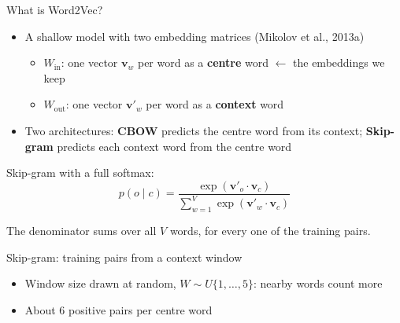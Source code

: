 \documentclass[aspectratio=169,11pt]{beamer}
\newcommand{\muted}[1]{\textcolor{muted}{#1}}
\newcommand{\hl}[1]{\textcolor{accent}{\textbf{#1}}}
\begin{document}
\begin{frame}{What is Word2Vec?}
    \begin{itemize}
        \item A shallow model with two embedding matrices \muted{(Mikolov et al., 2013a)}
        \begin{itemize}
            \item $W_{\text{in}}$: one vector $\mathbf{v}_w$ per word as a \hl{centre} word \quad $\leftarrow$ the embeddings we keep
            \item $W_{\text{out}}$: one vector $\mathbf{v}'_w$ per word as a \hl{context} word
        \end{itemize}
        \item Two architectures: \textbf{CBOW} predicts the centre word from its context;
              \textbf{Skip-gram} predicts each context word from the centre word
    \end{itemize}
    \vspace{3mm}
    Skip-gram with a full softmax:
    \[
        p(o \mid c) = \frac{\exp(\mathbf{v}'_o \cdot \mathbf{v}_c)}{\sum_{w=1}^{V} \exp(\mathbf{v}'_w \cdot \mathbf{v}_c)}
    \]
    \begin{center}
        \muted{The denominator sums over all $V$ words, for every one of the \FinalStepsMillions{} training pairs.}
    \end{center}
\end{frame}

\begin{frame}{Skip-gram: training pairs from a context window}
    \begin{center}
        \resizebox{0.82\textwidth}{!}{}
    \end{center}
    \vspace{1mm}
    \begin{itemize}
        \item Window size drawn at random, $W \sim U\{1, \dots, 5\}$: nearby words count more
        \item About 6 positive pairs per centre word
    \end{itemize}
\end{frame}
\end{document}
